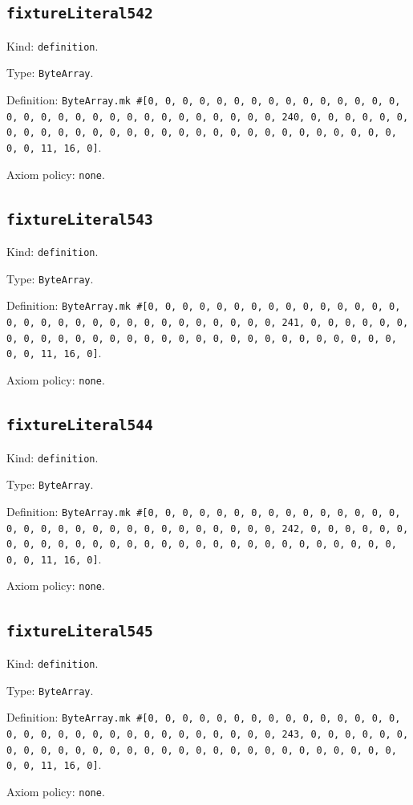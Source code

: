 \documentclass[11pt]{article}
\begin{document}
\subsection*{\texttt{fixtureLiteral542}}
\noindent Kind: \texttt{definition}.\par
\noindent Type: \texttt{ByteArray}.\par
\noindent Definition: \texttt{ByteArray.mk \#[0, 0, 0, 0, 0, 0, 0, 0, 0, 0, 0, 0, 0, 0, 0, 0, 0, 0, 0, 0, 0, 0, 0, 0, 0, 0, 0, 0, 0, 0, 0, 240, 0, 0, 0, 0, 0, 0, 0, 0, 0, 0, 0, 0, 0, 0, 0, 0, 0, 0, 0, 0, 0, 0, 0, 0, 0, 0, 0, 0, 0, 0, 0, 11, 16, 0]}.\par
\noindent Axiom policy: \texttt{none}.\par
\subsection*{\texttt{fixtureLiteral543}}
\noindent Kind: \texttt{definition}.\par
\noindent Type: \texttt{ByteArray}.\par
\noindent Definition: \texttt{ByteArray.mk \#[0, 0, 0, 0, 0, 0, 0, 0, 0, 0, 0, 0, 0, 0, 0, 0, 0, 0, 0, 0, 0, 0, 0, 0, 0, 0, 0, 0, 0, 0, 0, 241, 0, 0, 0, 0, 0, 0, 0, 0, 0, 0, 0, 0, 0, 0, 0, 0, 0, 0, 0, 0, 0, 0, 0, 0, 0, 0, 0, 0, 0, 0, 0, 11, 16, 0]}.\par
\noindent Axiom policy: \texttt{none}.\par
\subsection*{\texttt{fixtureLiteral544}}
\noindent Kind: \texttt{definition}.\par
\noindent Type: \texttt{ByteArray}.\par
\noindent Definition: \texttt{ByteArray.mk \#[0, 0, 0, 0, 0, 0, 0, 0, 0, 0, 0, 0, 0, 0, 0, 0, 0, 0, 0, 0, 0, 0, 0, 0, 0, 0, 0, 0, 0, 0, 0, 242, 0, 0, 0, 0, 0, 0, 0, 0, 0, 0, 0, 0, 0, 0, 0, 0, 0, 0, 0, 0, 0, 0, 0, 0, 0, 0, 0, 0, 0, 0, 0, 11, 16, 0]}.\par
\noindent Axiom policy: \texttt{none}.\par
\subsection*{\texttt{fixtureLiteral545}}
\noindent Kind: \texttt{definition}.\par
\noindent Type: \texttt{ByteArray}.\par
\noindent Definition: \texttt{ByteArray.mk \#[0, 0, 0, 0, 0, 0, 0, 0, 0, 0, 0, 0, 0, 0, 0, 0, 0, 0, 0, 0, 0, 0, 0, 0, 0, 0, 0, 0, 0, 0, 0, 243, 0, 0, 0, 0, 0, 0, 0, 0, 0, 0, 0, 0, 0, 0, 0, 0, 0, 0, 0, 0, 0, 0, 0, 0, 0, 0, 0, 0, 0, 0, 0, 11, 16, 0]}.\par
\noindent Axiom policy: \texttt{none}.\par
\end{document}
